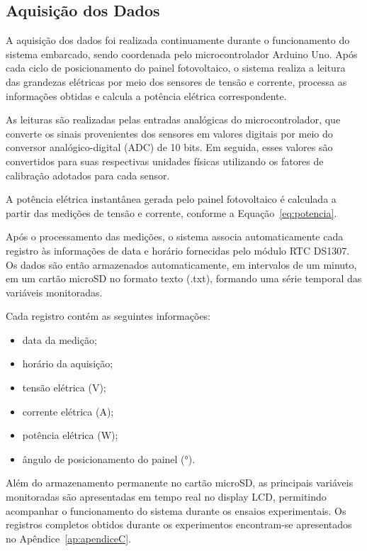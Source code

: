 \subsection{Aquisição dos Dados}

A aquisição dos dados foi realizada continuamente durante o funcionamento do sistema embarcado, sendo coordenada pelo microcontrolador Arduino Uno. Após cada ciclo de posicionamento do painel fotovoltaico, o sistema realiza a leitura das grandezas elétricas por meio dos sensores de tensão e corrente, processa as informações obtidas e calcula a potência elétrica correspondente.

As leituras são realizadas pelas entradas analógicas do microcontrolador, que converte os sinais provenientes dos sensores em valores digitais por meio do conversor analógico-digital (ADC) de 10 bits. Em seguida, esses valores são convertidos para suas respectivas unidades físicas utilizando os fatores de calibração adotados para cada sensor.

A potência elétrica instantânea gerada pelo painel fotovoltaico é calculada a partir das medições de tensão e corrente, conforme a Equação~\ref{eq:potencia}.

Após o processamento das medições, o sistema associa automaticamente cada registro às informações de data e horário fornecidas pelo módulo RTC DS1307. Os dados são então armazenados automaticamente, em intervalos de um minuto, em um cartão microSD no formato texto (.txt), formando uma série temporal das variáveis monitoradas.

Cada registro contém as seguintes informações:

\begin{itemize}
    \item data da medição;
    \item horário da aquisição;
    \item tensão elétrica (V);
    \item corrente elétrica (A);
    \item potência elétrica (W);
    \item ângulo de posicionamento do painel (°).
\end{itemize}

Além do armazenamento permanente no cartão microSD, as principais variáveis monitoradas são apresentadas em tempo real no display LCD, permitindo acompanhar o funcionamento do sistema durante os ensaios experimentais. Os registros completos obtidos durante os experimentos encontram-se apresentados no Apêndice~\ref{ap:apendiceC}.

